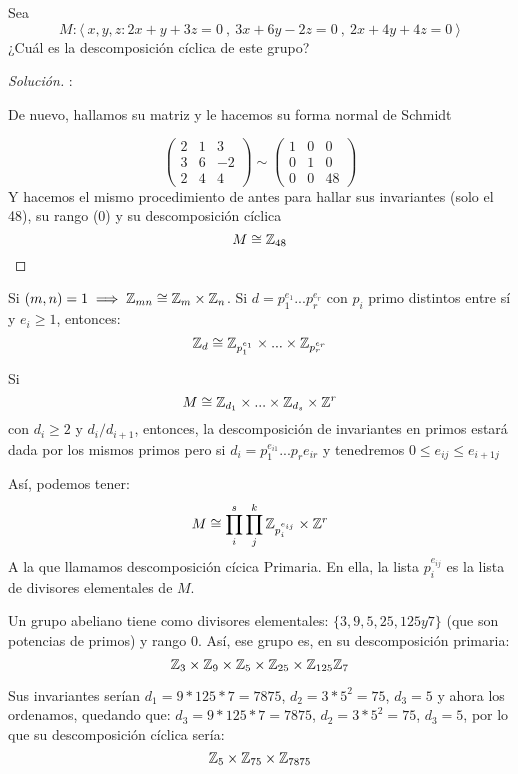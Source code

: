 \begin{ejemplo}
	Sea
	\[
	M: \langle \ x,y,z :  2x+y+3z = 0  \ , \ 3x+6y-2z = 0 \ , \ 2x+4y+4z = 0 \ \rangle
	\]
	¿Cuál es la descomposición cíclica de este grupo?
\end{ejemplo}
\begin{proof}[Solución]:

De nuevo, hallamos su matriz y le hacemos su forma normal de Schmidt

\[
	\begin{pmatrix}
 2& 1  & 3 \\
 3 & 6 & -2 \\
 2 & 4 & 4
\end{pmatrix}  \sim 	\begin{pmatrix}
 1 & 0 & 0 \\
 0 & 1 & 0 \\
 0 & 0 & 48
\end{pmatrix}
\]
Y hacemos el mismo procedimiento de antes para hallar sus invariantes (solo el 48), su rango (0) y su descomposición cíclica
\[
M \cong \mathbb{Z}_{48}
\]


\end{proof}

\begin{nprop}
	Si $(m,n) = 1 \implies \mathbb{Z}_{mn} \cong \mathbb{Z}_m \times \mathbb{Z}_n$.
Si $d = p_1^{e_1}...p_r^{e_r}$ con $p_i$ primo distintos entre sí y $e_i \geq 1$, entonces:
\[
\mathbb{Z}_d \cong \mathbb{Z}_{p_1^{e_1}} \times ... \times \mathbb{Z}_{p_r^{e_r}}
\]
\end{nprop}

\begin{nprop}
	Si
	\[
	M \cong \mathbb{Z}_{d_1} \times ... \times \mathbb{Z}_{d_s} \times \mathbb{Z}^r
	\]
	con $d_i \geq 2 $ y $d_i / d_{i+1}$, entonces, la descomposición de invariantes en primos estará dada por los mismos primos pero si $d_i = p_1^{e_{i1}}...p_r{e_{ir}}$ y tenedremos $0 \leq e_{ij} \leq e_{i+1j}$

	Así, podemos tener:
	\[
	M \cong \prod_i^s \prod_j ^k \mathbb{Z}_{p_i^{e_{ij}}} \times \mathbb{Z}^r
	\]
	A la que llamamos descomposición cícica Primaria. En ella, la lista ${p_i^{e_{ij}}}$ es la lista de divisores elementales de $M$.
\end{nprop}
\begin{ejemplo}
	Un grupo abeliano tiene como divisores elementales: $\{3,9,5,25,125 y 7\} $ (que son potencias de primos) y rango 0. Así, ese grupo es, en su descomposición primaria:
	\[
	\mathbb{Z}_3 \times \mathbb{Z}_9 \times \mathbb{Z}_5 \times \mathbb{Z}_{25} \times \mathbb{Z}_{125} \mathbb{Z}_7
	\]

Sus invariantes serían $d_1 = 9*125*7 = 7875$, $d_2 = 3*5^2 = 75$, $d_3 = 5$ y ahora los ordenamos, quedando que: $d_3 = 9*125*7 = 7875$, $d_2 = 3*5^2 = 75$, $d_3 = 5$, por lo que su descomposición cíclica sería:
\[
\mathbb{Z}_5 \times \mathbb{Z}_{75} \times \mathbb{Z}_{7875}
\]
\end{ejemplo}
